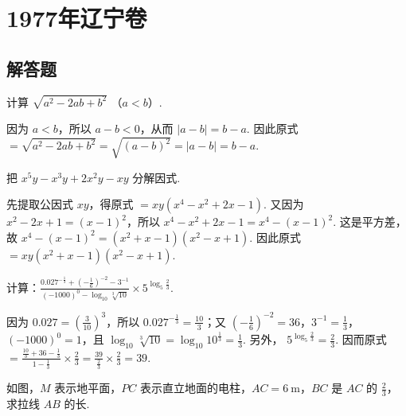 \chapter{1977年辽宁卷}

\section{解答题}

\begin{problem}
计算 \( \sqrt{a^2-2ab+b^2} \) （\( a<b \)）.
\end{problem}

\begin{solution}
因为 \(a<b\)，所以 \(a-b<0\)，从而 \(\lvert a-b\rvert=b-a\). 因此原式
\(=\sqrt{a^2-2ab+b^2}=\sqrt{(a-b)^2}=\lvert a-b\rvert=b-a\).
\end{solution}

\begin{problem}
把 \( x^5y-x^3y+2x^2y-xy \) 分解因式.
\end{problem}

\begin{solution}
先提取公因式 \(xy\)，得原式 \(=xy\left(x^4-x^2+2x-1\right)\). 又因为
\(x^2-2x+1=(x-1)^2\)，所以 \(x^4-x^2+2x-1=x^4-(x-1)^2\). 这是平方差，故
\(x^4-(x-1)^2=\left(x^2+x-1\right)\left(x^2-x+1\right)\). 因此原式
\(=xy\left(x^2+x-1\right)\left(x^2-x+1\right)\).
\end{solution}

\begin{problem}
计算：\( \frac{0.027^{-\frac{1}{3}}+\left( -\frac{1}{6} \right)^{-2}-3^{-1}}{\left( -1000 \right)^0-\log_{10}\sqrt[3]{10}}\times 5^{\log_{5}\frac{2}{3}} \).
\end{problem}

\begin{solution}
因为 \(0.027=\left(\frac{3}{10}\right)^3\)，所以 \(0.027^{-\frac13}=\frac{10}{3}\)；又
\(\left(-\frac16\right)^{-2}=36\)，\(3^{-1}=\frac13\)，\((-1000)^0=1\)，且
\(\log_{10}\sqrt[3]{10}=\log_{10}10^{\frac{1}{3}}=\frac13\). 另外，
\(5^{\log_5\frac23}=\frac23\). 因而原式
\(=\frac{\frac{10}{3}+36-\frac13}{1-\frac13}\times\frac23
=\frac{39}{\frac23}\times\frac23=39\).
\end{solution}

\begin{problem}
如图，\(M\) 表示地平面，\(PC\) 表示直立地面的电柱，\( AC=6\mathrm{~m} \)，\(BC\) 是 \(AC\) 的 \( \frac{2}{3} \)，求拉线 \(AB\) 的长.

\begin{center}
\end{center}
\end{problem}


